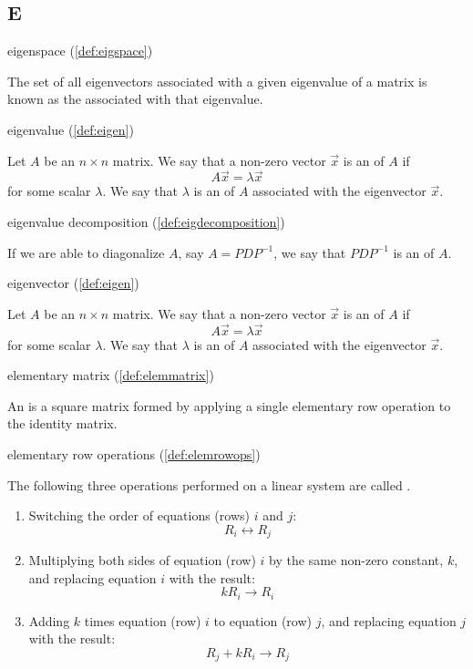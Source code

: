 \documentclass{ximera}
\begin{document}
\subsection{E}

eigenspace (\ref{def:eigspace})
\begin{expandable}
    The set of all eigenvectors associated with a given eigenvalue of a matrix is known as the  associated with that eigenvalue.
\end{expandable}

eigenvalue (\ref{def:eigen})
\begin{expandable}
    Let $A$ be an $n \times n$ matrix.  We say that a non-zero vector $\vec{x}$ is an  of $A$ if $$A\vec{x} = \lambda \vec{x}$$
for some scalar $\lambda$.
We say that $\lambda$ is an  of $A$ associated with the eigenvector $\vec{x}$.
\end{expandable}

eigenvalue decomposition (\ref{def:eigdecomposition})
\begin{expandable}
    If we are able to diagonalize $A$, say $A=PDP^{-1}$, we say that $PDP^{-1}$ is an  of $A$.
\end{expandable}

eigenvector (\ref{def:eigen})
\begin{expandable}
    Let $A$ be an $n \times n$ matrix.  We say that a non-zero vector $\vec{x}$ is an  of $A$ if $$A\vec{x} = \lambda \vec{x}$$
for some scalar $\lambda$.
We say that $\lambda$ is an  of $A$ associated with the eigenvector $\vec{x}$.
\end{expandable}

elementary matrix (\ref{def:elemmatrix})
\begin{expandable}
    An  is a square matrix formed by applying a single elementary row operation to the identity matrix.
\end{expandable}

elementary row operations (\ref{def:elemrowops})
\begin{expandable}
    The following three operations performed on a linear system are called .
\begin{enumerate}
\item Switching the order of equations (rows) $i$ and $j$:
$$R_i\leftrightarrow R_j$$
\item Multiplying both sides of equation (row) $i$ by the same non-zero constant, $k$, and replacing equation $i$ with the result:
$$kR_i\rightarrow R_i$$
\item Adding $k$ times equation (row) $i$ to equation (row) $j$, and replacing equation $j$ with the result:
$$R_j+kR_i\rightarrow R_j$$
\end{enumerate}
\end{expandable}
\end{document}
